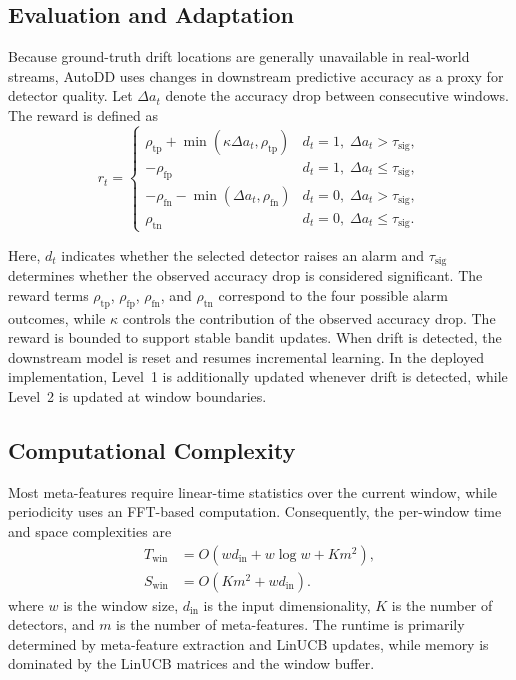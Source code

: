 \documentclass[conference]{IEEEtran}
\begin{document}
\subsection{Evaluation and Adaptation}

Because ground-truth drift locations are generally unavailable in real-world streams, AutoDD uses changes in downstream predictive accuracy as a proxy for detector quality. Let $\Delta a_t$ denote the accuracy drop between consecutive windows. The reward is defined as
\begin{equation}
\label{eq:reward}
r_t =
\begin{cases}
\rho_{\mathrm{tp}}
+\min(\kappa\Delta a_t,\rho_{\mathrm{tp}})
& d_t=1,\; \Delta a_t>\tau_{\mathrm{sig}}, \\

-\rho_{\mathrm{fp}}
& d_t=1,\; \Delta a_t\leq\tau_{\mathrm{sig}}, \\

-\rho_{\mathrm{fn}}
-\min(\Delta a_t,\rho_{\mathrm{fn}})
& d_t=0,\; \Delta a_t>\tau_{\mathrm{sig}}, \\

\rho_{\mathrm{tn}}
& d_t=0,\; \Delta a_t\leq\tau_{\mathrm{sig}} .
\end{cases}
\end{equation}

Here, $d_t$ indicates whether the selected detector raises an alarm and $\tau_{\mathrm{sig}}$ determines whether the observed accuracy drop is considered significant. The reward terms $\rho_{\mathrm{tp}}$, $\rho_{\mathrm{fp}}$, $\rho_{\mathrm{fn}}$, and $\rho_{\mathrm{tn}}$ correspond to the four possible alarm outcomes, while $\kappa$ controls the contribution of the observed accuracy drop. The reward is bounded to support stable bandit updates. When drift is detected, the downstream model is reset and resumes incremental learning. In the deployed implementation, Level~1 is additionally updated whenever drift is detected, while Level~2 is updated at window boundaries.


\subsection{Computational Complexity}

Most meta-features require linear-time statistics over the current window, while periodicity uses an FFT-based computation. Consequently, the per-window time and space complexities are
\begin{equation}
\begin{aligned}
T_{\mathrm{win}} &= O(wd_{\mathrm{in}} + w\log w + Km^2), \\
S_{\mathrm{win}} &= O(Km^2 + wd_{\mathrm{in}}).
\end{aligned}
\end{equation}
where $w$ is the window size, $d_{\mathrm{in}}$ is the input dimensionality, $K$ is the number of detectors, and $m$ is the number of meta-features. The runtime is primarily determined by meta-feature extraction and LinUCB updates, while memory is dominated by the LinUCB matrices and the window buffer.
\end{document}
